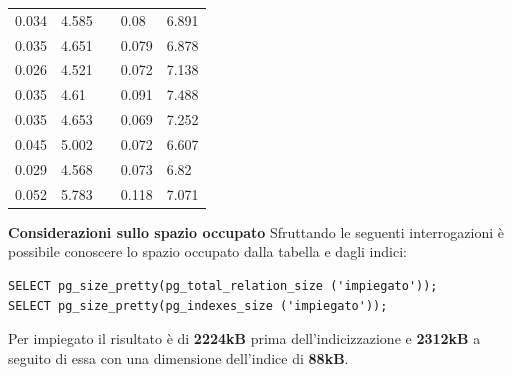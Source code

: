 \documentclass{article}
\begin{document}
\begin{table}[H]
\begin{tabular}{|p{4cm}|p{4cm}|p{0cm}|p{4cm}|p{4cm}|}
0.034 & 4.585 & & 0.08 & 6.891 \\ \cline{1-5}
0.035 & 4.651 & & 0.079 & 6.878 \\ \cline{1-5}
0.026 & 4.521 & & 0.072 & 7.138 \\ \cline{1-5}
0.035 & 4.61 & & 0.091 & 7.488 \\ \cline{1-5}
0.035 & 4.653 & & 0.069 & 7.252 \\ \cline{1-5}
0.045 & 5.002 & & 0.072 & 6.607 \\ \cline{1-5}
0.029 & 4.568 & & 0.073 & 6.82 \\ \cline{1-5}
0.052 & 5.783 & & 0.118 & 7.071 \\ \cline{1-5}
\end{tabular}
\end{table}
\noindent
\newline
\textbf{Considerazioni sullo spazio occupato}
\newline
\newline
Sfruttando le seguenti interrogazioni è possibile conoscere lo spazio occupato dalla tabella e dagli indici:
\begin{verbatim}
SELECT pg_size_pretty(pg_total_relation_size ('impiegato'));
SELECT pg_size_pretty(pg_indexes_size ('impiegato'));
\end{verbatim}
Per impiegato il risultato è di \textbf{2224kB} prima dell'indicizzazione e \textbf{2312kB} a seguito di essa con una dimensione dell'indice di \textbf{88kB}.
\end{document}
